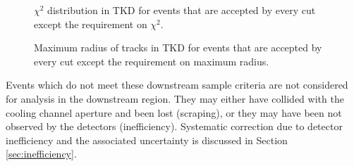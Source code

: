 \begin{figure}[!tbh]
    \centering
    {$\chi^2$ distribution in TKD for events that are accepted by every cut 
     except the requirement on $\chi^2$. \label{fig:tkd_chi2}}
\end{figure}

\begin{figure}[!tbh]
    \centering
    {Maximum radius of tracks in TKD for events that are accepted by every cut 
     except the requirement on maximum radius. \label{fig:tkd_max_r}}
\end{figure}

\begin{figure}[!tbh]
    \centering
\end{figure}

Events which do not meet these downstream sample criteria are not considered
for analysis in the downstream region. They may either have collided with the 
cooling channel aperture and been lost (scraping), or 
they may have been not observed by the detectors (inefficiency). Systematic 
correction due to detector inefficiency and the associated uncertainty is 
discussed in Section \ref{sec:inefficiency}.
